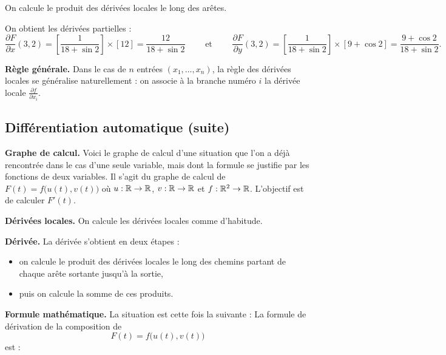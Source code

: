 
On calcule le produit des dérivées locales le long des arêtes. 

On obtient les dérivées partielles :
{\small
	$$\frac{\partial F}{\partial x} (3,2) = \left[ \frac{1}{18+\sin 2} \right] \times [12] = \frac{12}{18 + \sin 2}
	\qquad \text{ et } \qquad 
	\frac{\partial F}{\partial y} (3,2) = \left[ \frac{1}{18+\sin 2} \right] \times [9 + \cos 2] = \frac{9 + \cos 2}{18+\sin 2}.$$
}

\bigskip
\textbf{Règle générale.}
Dans le cas de $n$ entrées $(x_1,\ldots,x_n)$, la règle des dérivées locales se généralise naturellement : on associe à la branche numéro $i$ la dérivée locale $\frac{\partial f}{\partial x_i}$.



\subsection{Différentiation automatique (suite)}


\textbf{Graphe de calcul.}
Voici le graphe de calcul d'une situation que l'on a déjà rencontrée dans le cas d'une seule variable, mais dont la formule se justifie par les fonctions de deux variables.
Il s'agit du graphe de calcul de $F(t) = f\big( u(t), v(t) \big)$ où
$u : \mathbb{R} \to \mathbb{R}$, $v : \mathbb{R} \to \mathbb{R}$ et $f : \mathbb{R}^2 \to \mathbb{R}$. L'objectif est de calculer $F'(t)$.


\bigskip
\textbf{Dérivées locales.}
On calcule les dérivées locales comme d'habitude.

\bigskip
\textbf{Dérivée.}
La dérivée s'obtient en deux étapes :
\begin{itemize}
	\item on calcule le produit des dérivées locales le long des chemins partant de chaque arête sortante jusqu'à la sortie,
	\item puis on calcule la somme de ces produits.
\end{itemize}


\bigskip
\textbf{Formule mathématique.}
La situation est cette fois la suivante :
La formule de dérivation de la composition de
$$F(t) = f\big( u(t), v(t) \big)$$
est :


